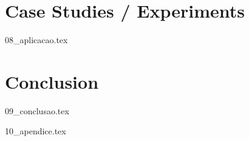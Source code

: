 \documentclass[
  oneside,
  11pt, a4paper,
  footinclude=true,
  headinclude=true,
  cleardoublepage=empty
]{scrbook}
\begin{document}
	\chapter{Case Studies / Experiments}
    {08_aplicacao.tex}

	\chapter{Conclusion}
    {09_conclusao.tex}
			

	

	
    {10_apendice.tex}
	
\end{document}
